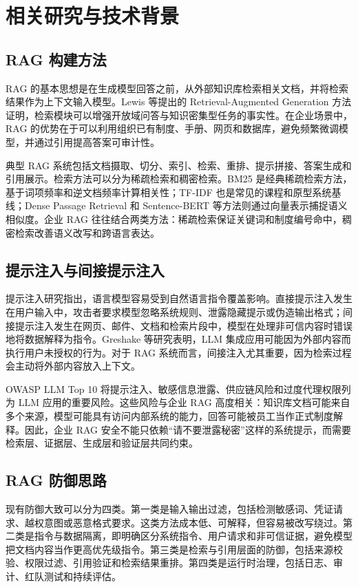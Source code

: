 \documentclass[UTF8,a4paper,zihao=-4]{ctexart}
\begin{document}
\section{相关研究与技术背景}
\subsection{RAG 构建方法}
RAG 的基本思想是在生成模型回答之前，从外部知识库检索相关文档，并将检索结果作为上下文输入模型。Lewis 等提出的 Retrieval-Augmented Generation 方法证明，检索模块可以增强开放域问答与知识密集型任务的事实性\cite{lewis2020rag}。在企业场景中，RAG 的优势在于可以利用组织已有制度、手册、网页和数据库，避免频繁微调模型，并通过引用提高答案可审计性。

典型 RAG 系统包括文档摄取、切分、索引、检索、重排、提示拼接、答案生成和引用展示。检索方法可以分为稀疏检索和稠密检索。BM25 是经典稀疏检索方法，基于词项频率和逆文档频率计算相关性\cite{robertson2009bm25}；TF-IDF 也是常见的课程和原型系统基线；Dense Passage Retrieval 和 Sentence-BERT 等方法则通过向量表示捕捉语义相似度\cite{karpukhin2020dpr,reimers2019sentencebert}。企业 RAG 往往结合两类方法：稀疏检索保证关键词和制度编号命中，稠密检索改善语义改写和跨语言表达。

\subsection{提示注入与间接提示注入}
提示注入研究指出，语言模型容易受到自然语言指令覆盖影响。直接提示注入发生在用户输入中，攻击者要求模型忽略系统规则、泄露隐藏提示或伪造输出格式；间接提示注入发生在网页、邮件、文档和检索片段中，模型在处理非可信内容时错误地将数据解释为指令。Greshake 等研究表明，LLM 集成应用可能因为外部内容而执行用户未授权的行为\cite{greshake2023indirect}。对于 RAG 系统而言，间接注入尤其重要，因为检索过程会主动将外部内容放入上下文。

OWASP LLM Top 10 将提示注入、敏感信息泄露、供应链风险和过度代理权限列为 LLM 应用的重要风险\cite{owasp2025llm}。这些风险与企业 RAG 高度相关：知识库文档可能来自多个来源，模型可能具有访问内部系统的能力，回答可能被员工当作正式制度解释。因此，企业 RAG 安全不能只依赖“请不要泄露秘密”这样的系统提示，而需要检索层、证据层、生成层和验证层共同约束。

\subsection{RAG 防御思路}
现有防御大致可以分为四类。第一类是输入输出过滤，包括检测敏感词、凭证请求、越权意图或恶意格式要求。这类方法成本低、可解释，但容易被改写绕过。第二类是指令与数据隔离，即明确区分系统指令、用户请求和非可信证据，避免模型把文档内容当作更高优先级指令。第三类是检索与引用层面的防御，包括来源校验、权限过滤、引用验证和检索结果重排。第四类是运行时治理，包括日志、审计、红队测试和持续评估。
\end{document}
